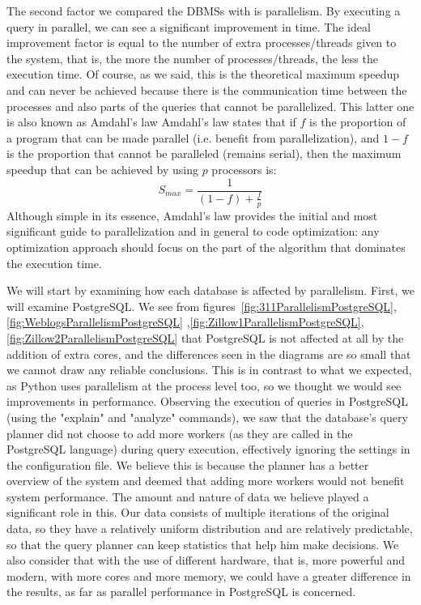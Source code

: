 
The second factor we compared the DBMSs with is parallelism. By executing a query in parallel, 
we can see a significant improvement in time. The ideal improvement factor is equal to the 
number of extra processes/threads given to the system, that is, the more the number 
of processes/threads, the less the execution time. Of course, as we said, this is the 
theoretical maximum speedup and can never be achieved because there is the communication 
time between the processes and also parts of the queries that cannot be parallelized. 
This latter one is also known as Amdahl's law
Amdahl's law states that if 
$f$ is the proportion of a program that can be made parallel (i.e. benefit from parallelization), 
and $1-f$ is the proportion that cannot be paralleled (remains serial), then the maximum 
speedup that can be achieved by using $p$ processors is: 
\begin{equation}
    S_{max} = \frac{1}{\left ( 1-f \right ) + \frac{f}{p}}
\end{equation}
Although simple in its essence, Amdahl's law provides the initial and most significant 
guide to parallelization and in general to code optimization: any optimization approach 
should focus on the part of the algorithm that dominates the execution time.



We will start by examining how each database is affected by parallelism. First, we will 
examine PostgreSQL. We see from figures~\ref{fig:311ParallelismPostgreSQL},\ref{fig:WeblogsParallelismPostgreSQL}
,\ref{fig:Zillow1ParallelismPostgreSQL},\ref{fig:Zillow2ParallelismPostgreSQL} that 
PostgreSQL is not affected at all by the addition of extra cores, and the differences 
seen in the diagrams are so small that we cannot draw any reliable conclusions. 
This is in contrast to what we expected, as Python uses parallelism at the process level too, 
so we thought we would see improvements in performance. Observing the execution of queries 
in PostgreSQL (using the "explain" and "analyze" commands), we saw that the database's 
query planner did not choose to add more workers (as they are called in the PostgreSQL language) 
during query execution, effectively ignoring the settings in the configuration file. 
We believe this is because the planner has a better overview of the system and deemed 
that adding more workers would not benefit system performance. The amount and nature of data 
we believe played a significant role in this. Our data consists of multiple iterations of the 
original data, so they have a relatively uniform distribution and are relatively predictable, 
so that the query planner can keep statistics that help him make decisions. We also consider 
that with the use of different hardware, that is, more powerful and modern, with more cores and 
more memory, we could have a greater difference in the results, as far as parallel performance 
in PostgreSQL is concerned.

